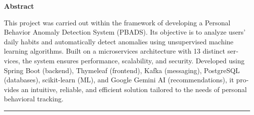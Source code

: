 \documentclass[
    12pt,
    a4paper,
    oneside
]{report}
\begin{document}
\begin{english}
    \begin{center}
        {\large\bfseries Abstract}
    \end{center}
    \vspace{0.5em}
    \justifying
    This project was carried out within the framework of developing a Personal Behavior Anomaly Detection System (PBADS). Its objective is to analyze users' daily habits and automatically detect anomalies using unsupervised machine learning algorithms. Built on a microservices architecture with 13 distinct services, the system ensures performance, scalability, and security. Developed using Spring Boot (backend), Thymeleaf (frontend), Kafka (messaging), PostgreSQL (databases), scikit-learn (ML), and Google Gemini AI (recommendations), it provides an intuitive, reliable, and efficient solution tailored to the needs of personal behavioral tracking.
\end{english}

\bigskip
\hrule
\bigskip
\end{document}
